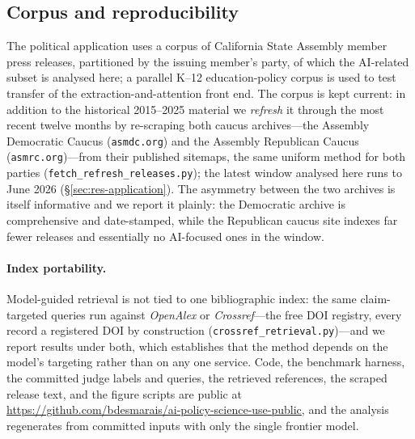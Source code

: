 \subsection{Corpus and reproducibility}
\label{sec:methods-corpus}
The political application uses a corpus of California State Assembly member press releases, partitioned by
the issuing member's party, of which the AI-related subset is analysed here; a parallel K--12
education-policy corpus is used to test transfer of the extraction-and-attention front end. The corpus is
kept current: in addition to the historical 2015--2025 material we \emph{refresh} it through the most
recent twelve months by re-scraping both caucus archives---the Assembly Democratic Caucus
(\texttt{asmdc.org}) and the Assembly Republican Caucus (\texttt{asmrc.org})---from their published
sitemaps, the same uniform method for both parties (\texttt{fetch\_refresh\_releases.py}); the latest
window analysed here runs to June 2026 (\S\ref{sec:res-application}). The asymmetry between the two archives
is itself informative and we report it plainly: the Democratic archive is comprehensive and date-stamped,
while the Republican caucus site indexes far fewer releases and essentially no AI-focused ones in the
window.

\paragraph{Index portability.} Model-guided retrieval is not tied to one bibliographic index: the same
claim-targeted queries run against \emph{OpenAlex} or \emph{Crossref}---the free DOI registry, every record
a registered DOI by construction (\texttt{crossref\_retrieval.py})---and we report results under both,
which establishes that the method depends on the model's targeting rather than on any one service. Code,
the benchmark harness, the committed judge labels and queries, the retrieved references, the scraped
release text, and the figure scripts are public at
\url{https://github.com/bdesmarais/ai-policy-science-use-public}, and the analysis regenerates from
committed inputs with only the single frontier model.

